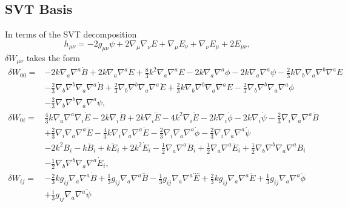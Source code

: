 \documentclass[10pt,letterpaper]{article}
\numberwithin{equation}{subsection}
\begin{document}
\subsection{SVT Basis}
In terms of the SVT decomposition
\begin{equation}
h_{\mu\nu} = -2 g_{\mu\nu}\psi + 2\nabla_\mu \nabla_\nu E + \nabla_\mu E_\nu +\nabla_\nu E_\mu + 2E_{\mu\nu},
\end{equation}
$\delta W_{\mu\nu}$ takes the form 
\begin{align}
\delta W_{00}={}&-2 k \nabla_{a}\nabla^{a}\dot{B}
 + 2 k \nabla_{a}\nabla^{a}\ddot{E}
 + \tfrac{8}{3} k^2 \nabla_{a}\nabla^{a}E
 - 2 k \nabla_{a}\nabla^{a}\phi
 - 2 k \nabla_{a}\nabla^{a}\psi
 -  \tfrac{2}{3} k \nabla_{b}\nabla_{a}\nabla^{b}\nabla^{a}E\nonumber\\
& -  \tfrac{2}{3} \nabla_{b}\nabla^{b}\nabla_{a}\nabla^{a}\dot{B}
 + \tfrac{2}{3} \nabla_{b}\nabla^{b}\nabla_{a}\nabla^{a}\ddot{E}
 + \tfrac{2}{3} k \nabla_{b}\nabla^{b}\nabla_{a}\nabla^{a}E
 -  \tfrac{2}{3} \nabla_{b}\nabla^{b}\nabla_{a}\nabla^{a}\phi\nonumber\\
& -  \tfrac{2}{3} \nabla_{b}\nabla^{b}\nabla_{a}\nabla^{a}\psi,
\\
\delta W_{0i}={}&\tfrac{4}{3} k \nabla_{a}\nabla^{a}\nabla_{i}\dot{E}
 - 2 k \nabla_{i}\ddot{B}
 + 2 k \nabla_{i}\dddot{E}
 - 4 k^2 \nabla_{i}\dot{E}
 - 2 k \nabla_{i}\dot{\phi}
 - 2 k \nabla_{i}\dot{\psi}
 -  \tfrac{2}{3} \nabla_{i}\nabla_{a}\nabla^{a}\ddot{B}\nonumber\\
& + \tfrac{2}{3} \nabla_{i}\nabla_{a}\nabla^{a}\dddot{E}
 -  \tfrac{4}{3} k \nabla_{i}\nabla_{a}\nabla^{a}\dot{E}
 -  \tfrac{2}{3} \nabla_{i}\nabla_{a}\nabla^{a}\dot{\phi}
 -  \tfrac{2}{3} \nabla_{i}\nabla_{a}\nabla^{a}\dot{\psi}
\nonumber\\
&-2 k^2 B_{i}
 -  k \ddot{B}_{i}
 + k \dddot{E}_{i}
 + 2 k^2 \dot{E}_{i}
 -  \tfrac{1}{2} \nabla_{a}\nabla^{a}\ddot{B}_{i}
 + \tfrac{1}{2} \nabla_{a}\nabla^{a}\dddot{E}_{i}
 + \tfrac{1}{2} \nabla_{b}\nabla^{b}\nabla_{a}\nabla^{a}B_{i}\nonumber\\
& -  \tfrac{1}{2} \nabla_{b}\nabla^{b}\nabla_{a}\nabla^{a}\dot{E}_{i},
\\
\delta W_{ij}={}&- \tfrac{2}{3} k g_{ij} \nabla_{a}\nabla^{a}\dot{B}
 + \tfrac{1}{3} g_{ij} \nabla_{a}\nabla^{a}\dddot{B}
 -  \tfrac{1}{3} g_{ij} \nabla_{a}\nabla^{a}\overset{\text{...}.}{E}
 + \tfrac{2}{3} k g_{ij} \nabla_{a}\nabla^{a}\ddot{E}
 + \tfrac{1}{3} g_{ij} \nabla_{a}\nabla^{a}\ddot{\phi}\nonumber\\
& + \tfrac{1}{3} g_{ij} \nabla_{a}\nabla^{a}\ddot{\psi}

\end{align}
\end{document}
